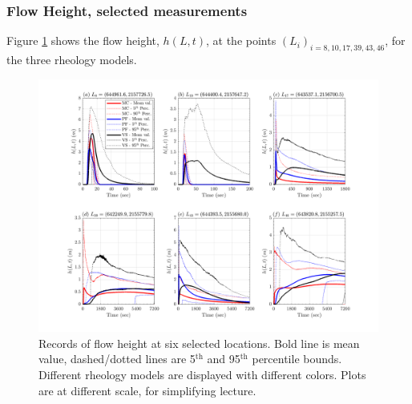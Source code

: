 \documentclass{article}
\begin{document}
\subsubsection{Flow Height, selected measurements}
Figure \ref{fig:Colima-H} shows the flow height, $h(L,t)$, at the points $(L_i)_{i=8,10,17,39,43,46}$, for the three rheology models.
\begin{figure}[H]
         \centering
        \includegraphics[width=1\textwidth]{BAF_VolcanDeColima/LocalMeasurments/Height.png}
        \caption{Records of flow height at six selected locations. Bold line is mean value, dashed/dotted lines are 5$^{\mathrm{th}}$ and 95$^{\mathrm{th}}$ percentile bounds. Different rheology models are displayed with different colors. Plots are at different scale, for simplifying lecture.}
        \label{fig:Colima-H}
\end{figure}
\end{document}
